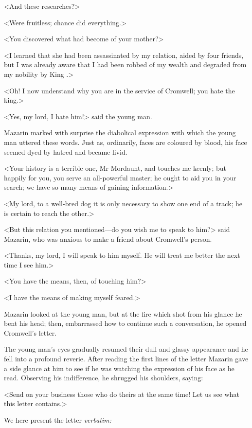 <And these researches?>

<Were fruitless; chance did everything.>

<You discovered what had become of your mother?>

<I learned that she had been assassinated by my relation, aided by four friends, but I was already aware that I had been robbed of my wealth and degraded from my nobility by King .>

<Oh! I now understand why you are in the service of Cromwell; you hate the king.>

<Yes, my lord, I hate him!> said the young man.

Mazarin marked with surprise the diabolical expression with which the young man uttered these words. Just as, ordinarily, faces are coloured by blood, his face seemed dyed by hatred and became livid.

<Your history is a terrible one, Mr Mordaunt, and touches me keenly; but happily for you, you serve an all-powerful master; he ought to aid you in your search; we have so many means of gaining information.>

<My lord, to a well-bred dog it is only necessary to show one end of a track; he is certain to reach the other.>

<But this relation you mentioned—do you wish me to speak to him?> said Mazarin, who was anxious to make a friend about Cromwell's person.

<Thanks, my lord, I will speak to him myself. He will treat me better the next time I see him.>

<You have the means, then, of touching him?>

<I have the means of making myself feared.>

Mazarin looked at the young man, but at the fire which shot from his glance he bent his head; then, embarrassed how to continue such a conversation, he opened Cromwell's letter.

The young man's eyes gradually resumed their dull and glassy appearance and he fell into a profound reverie. After reading the first lines of the letter Mazarin gave a side glance at him to see if he was watching the expression of his face as he read. Observing his indifference, he shrugged his shoulders, saying:

<Send on your business those who do theirs at the same time! Let us see what this letter contains.>

We here present the letter \emph{verbatim:}  

